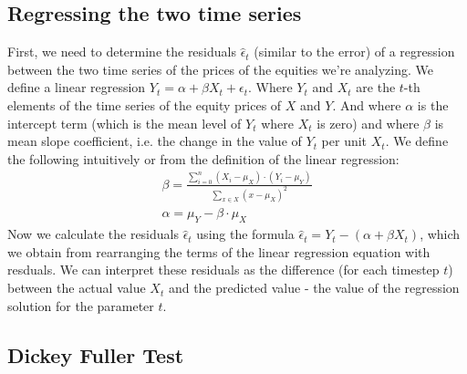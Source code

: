 \documentclass{article}
\begin{document}
\begin{spacing}{2.0}
\subsection{Regressing the two time series}

First, we need to determine the residuals $\hat \epsilon_{t}$ (similar to the error) of a regression between
the two time series of the prices of the equities we're analyzing. We define a linear regression $Y_{t} = \alpha + \beta X_{t} + \epsilon_{t}$.
Where $Y_{t}$ and $X_{t}$ are the $t$-th elements of the time series of the equity prices of $X$ and $Y$. And where $\alpha$ is the
intercept term (which is the mean level of $Y_{t}$ where $X_{t}$ is zero) and where $\beta$ is mean slope coefficient, i.e. the change in
the value of $Y_{t}$ per unit $X_{t}$.
We define the following intuitively or from the definition of the linear regression:
\begin{gather*}
    \beta = \frac{
        \sum_{i = 0}^{n}{(X_{i} - \mu_{X}) \cdot (Y_{i} - \mu_{Y})}
    }{
        \sum_{x \in X} (x - \mu_{X})^2
    }
    \\
    \alpha = \mu_{Y} - \beta \cdot \mu_{X}
\end{gather*}
Now we calculate the residuals $\hat \epsilon_{t}$ using the formula $\hat \epsilon_{t} = Y_{t} - (\alpha + \beta X_{t})$, which we obtain from rearranging the
terms of the linear regression equation with resduals. We can interpret these residuals as the difference (for each timestep $t$) between the actual value $X_{t}$
and the predicted value - the value of the regression solution for the parameter $t$.



\subsection{Dickey Fuller Test}


\end{spacing}
\end{document}
